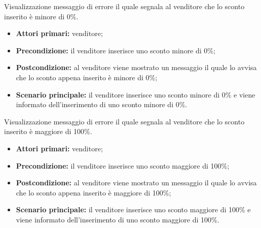 
Visualizzazione messaggio di errore il quale segnala al venditore che lo sconto inserito è minore di 0\%.
\begin{itemize}
    \item \textbf{Attori primari:} venditore;
    \item \textbf{Precondizione:} il venditore inserisce uno sconto minore di 0\%;
    \item \textbf{Postcondizione:} al venditore viene mostrato un messaggio il quale lo avvisa che lo sconto appena inserito è minore di 0\%;
    \item \textbf{Scenario principale:} il venditore inserisce uno sconto minore di 0\% e viene informato dell'inserimento di uno sconto minore di 0\%.
\end{itemize}


Visualizzazione messaggio di errore il quale segnala al venditore che lo sconto inserito è maggiore di 100\%.
\begin{itemize}
    \item \textbf{Attori primari:} venditore;
    \item \textbf{Precondizione:} il venditore inserisce uno sconto maggiore di 100\%;
    \item \textbf{Postcondizione:} al venditore viene mostrato un messaggio il quale lo avvisa che lo sconto appena inserito è maggiore di 100\%;
    \item \textbf{Scenario principale:} il venditore inserisce uno sconto maggiore di 100\% e viene informato dell'inserimento di uno sconto maggiore di 100\%.
\end{itemize}


